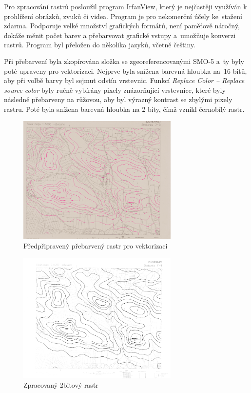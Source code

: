 \documentclass[thesis=M,czech]{FITthesis}[2012/06/26]
\begin{document}
Pro zpracování rastrů posloužil program IrfanView, který je nejčastěji využíván k prohlížení obrázků, zvuků či videa. Program je pro nekomerční účely ke~stažení zdarma. Podporuje velké množství grafických formátů, není paměťově náročný, dokáže měnit počet barev a přebarvovat grafické vstupy a~umožňuje konverzi rastrů. Program byl přeložen do několika jazyků, včetně češtiny. 

Při přebarvení byla zkopírována složka se zgeoreferencovanými SMO-5 a~ty byly poté upraveny pro vektorizaci. Nejprve byla snížena barevná hloubka na~16 bitů, aby při volbě barvy byl sejmut odstín vrstevnic. Funkcí \textit{Replace Color – Replace source color} byly ručně vybírány pixely znázorňující vrstevnice, které byly následně přebarveny na růžovou, aby byl výrazný kontrast se zbylými pixely rastru. Poté byla snížena barevná hloubka na 2 bity, čímž vznikl černobílý rastr. 

\begin{figure}[h]
	\centering
	\includegraphics[width=8cm]{pics/vrstevnice.png}
	\caption{Předpřipravený přebarvený rastr pro vektorizaci}
	\label{obrazek:vrstevniceruzova}
\end{figure}

\begin{figure}[h]
	\centering
	\includegraphics[width=8cm]{pics/vrstevnice2.png}
	\caption{Zpracovaný 2bitový rastr}
	\label{obrazek:vrstevnice2bit}
\end{figure}
\end{document}
